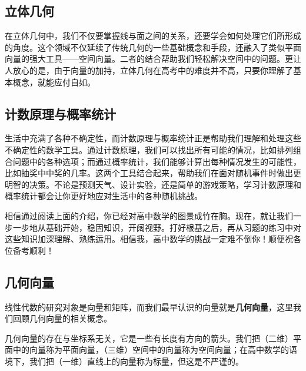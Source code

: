 \subsection{立体几何}

在立体几何中，我们不仅要掌握线与面之间的关系，还要学会如何处理它们所形成的角度。这个领域不仅延续了传统几何的一些基础概念和手段，还融入了类似平面向量的强大工具——空间向量。二者的结合帮助我们轻松解决空间中的问题。更让人放心的是，由于向量的加持，立体几何在高考中的难度并不高，只要你理解了基本概念，就能应付自如。

\subsection{计数原理与概率统计}

生活中充满了各种不确定性，而计数原理与概率统计正是帮助我们理解和处理这些不确定性的数学工具。通过计数原理，我们可以找出所有可能的情况，比如排列组合问题中的各种选项；而通过概率统计，我们能够计算出每种情况发生的可能性，比如抽奖中中奖的几率。这两个工具结合起来，帮助我们在面对随机事件时做出更明智的决策。不论是预测天气、设计实验，还是简单的游戏策略，学习计数原理和概率统计都会让你更好地应对生活中的各种随机挑战。

相信通过阅读上面的介绍，你已经对高中数学的图景成竹在胸。现在，就让我们一步一步地从基础开始，稳固知识，开阔视野。打好根基之后，再从习题的练习中对这些知识加深理解、熟练运用。相信我，高中数学的挑战一定难不倒你！顺便祝各位备考顺利！


\subsection{几何向量}

线性代数的研究对象是向量和矩阵，而我们最早认识的向量就是\textbf{几何向量}，这里我们回顾几何向量的相关概念。

几何向量的存在与坐标系无关，它是一些有长度有方向的箭头。我们把（二维）平面中的向量称为平面向量，（三维）空间中的向量称为空间向量；在高中数学的语境下，我们把（一维）直线上的向量称为标量，但这是不严谨的。



